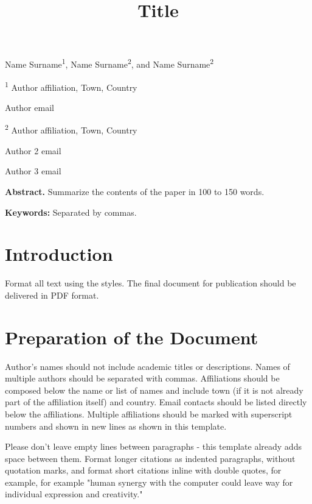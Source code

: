 \documentclass[]{article}
\title{Title}
\date{}
\begin{document}
\maketitle
\vspace*{-8em}

\begin{center}
Name Surname\textsuperscript{1}, Name Surname\textsuperscript{2}, and
Name
Surname\textsuperscript{2}

\textsuperscript{1} Author affiliation, Town, Country

Author email

\textsuperscript{2} Author affiliation, Town, Country

Author 2 email

Author 3 email

\end{center}

\textbf{Abstract.} Summarize the contents of the paper in 100 to 150 words.

\textbf{Keywords:} Separated by commas.

\section{Introduction}\label{introduction}

Format all text using the styles. The final document for publication should be delivered in PDF format.

\section{Preparation of the Document}\label{preparation-of-the-document}

Author's names should not include academic titles or descriptions. Names of multiple authors should be separated with commas. Affiliations should
be composed below the name or list of names and include town (if it is not already part of the affiliation itself) and country. Email contacts should be listed directly below the affiliations. Multiple affiliations should be marked with superscript numbers and shown in new lines as shown in this template.

Please don't leave empty lines between paragraphs - this template already adds space between them. Format longer citations as indented paragraphs, without quotation marks, and format short citations inline with double quotes, for example, for example "human synergy with the computer could leave way for individual expression and creativity." \cite{risset890237423423487}
\end{document}
